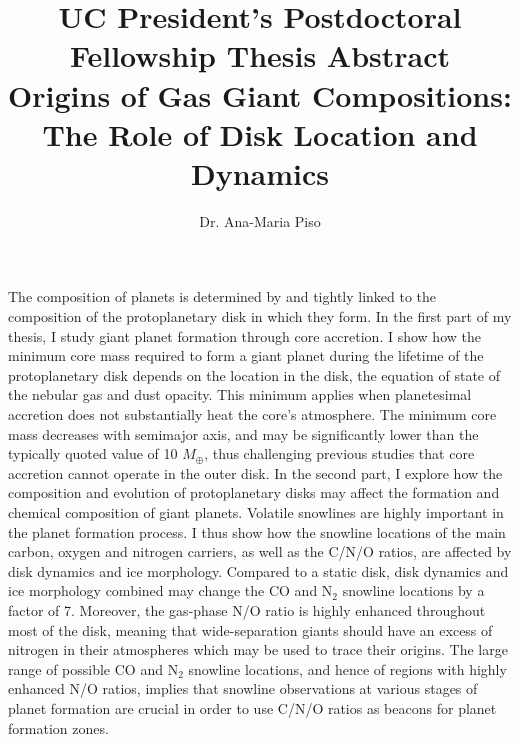 \documentclass[12pt, letterpaper]{article}
\date{}
\title{\Large UC President's Postdoctoral Fellowship Thesis Abstract \\
\textbf{Origins of Gas Giant Compositions: The Role of Disk Location and Dynamics}}
\author{Dr. Ana-Maria Piso}
\begin{document}
\maketitle


\vspace{-0.9cm}

The composition of planets is determined by and tightly linked to the composition of the protoplanetary disk in which they form. In the first part of my thesis, I study giant planet formation through core accretion. I show how the minimum core mass required to form a giant planet during the lifetime of the protoplanetary disk depends on the location in the disk, the equation of state of the nebular gas and dust opacity. This minimum applies when planetesimal accretion does not substantially heat the core's atmosphere. The minimum core mass decreases with semimajor axis, and may be significantly lower than the typically quoted value of 10 $M_{\oplus}$, thus challenging previous studies that core accretion cannot operate in the outer disk. In the second part, I explore how the composition and evolution of protoplanetary disks may affect the formation and chemical composition of giant planets. Volatile snowlines are highly important in the planet formation process. I thus show how the snowline locations of the main carbon, oxygen and nitrogen carriers, as well as the C/N/O ratios, are affected by disk dynamics and ice morphology. Compared to a static disk, disk dynamics and ice morphology combined may change the CO and N$_2$ snowline locations by a factor of 7. Moreover, the gas-phase N/O ratio is highly enhanced throughout most of the disk, meaning that wide-separation giants should have an excess of nitrogen in their atmospheres which may be used to trace their origins. The large range of possible CO and N$_2$ snowline locations, and hence of regions with highly enhanced N/O ratios, implies that snowline observations at various stages of planet formation are crucial in order to use C/N/O ratios as beacons for planet formation zones.  



%
%


\end{document}
